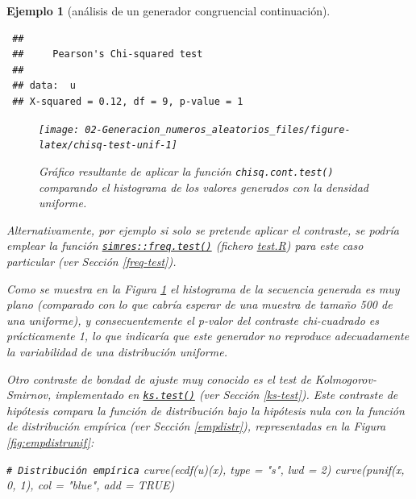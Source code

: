 \documentclass[
  10pt,
]{book}
\newenvironment{Shaded}{\begin{snugshade}}{\end{snugshade}}
\newcommand{\AttributeTok}[1]{\textcolor[rgb]{0.77,0.63,0.00}{#1}}
\newcommand{\CommentTok}[1]{\textcolor[rgb]{0.56,0.35,0.01}{\textit{#1}}}
\newcommand{\ConstantTok}[1]{\textcolor[rgb]{0.00,0.00,0.00}{#1}}
\newcommand{\DecValTok}[1]{\textcolor[rgb]{0.00,0.00,0.81}{#1}}
\newcommand{\FunctionTok}[1]{\textcolor[rgb]{0.00,0.00,0.00}{#1}}
\newcommand{\NormalTok}[1]{#1}
\newcommand{\StringTok}[1]{\textcolor[rgb]{0.31,0.60,0.02}{#1}}
\theoremstyle{break}
\newtheorem{example}{Ejemplo}[chapter]
\theoremstyle{nonumberplain}
\renewcommand{\CommentTok}[1]{\textcolor[rgb]{0.41,0.41,0.41}{\texttt{#1}}}
\begin{document}
\begin{example}[análisis de un generador congruencial continuación]
\begin{verbatim}
 ## 
 ##     Pearson's Chi-squared test
 ## 
 ## data:  u
 ## X-squared = 0.12, df = 9, p-value = 1
\end{verbatim}

\begin{figure}[!htbp]

{\centering \texttt{[image: 02-Generacion\_numeros\_aleatorios\_files/figure-latex/chisq-test-unif-1]} 

}

\caption{Gráfico resultante de aplicar la función \texttt{chisq.cont.test()} comparando el histograma de los valores generados con la densidad uniforme.}\label{fig:chisq-test-unif}
\end{figure}

Alternativamente, por ejemplo si solo se pretende aplicar el contraste, se podría emplear la función \href{https://rubenfcasal.github.io/simres/reference/freq.test.html}{\texttt{simres::freq.test()}} (fichero \href{R/test.R}{\emph{test.R}}) para este caso particular (ver Sección \ref{freq-test}).

Como se muestra en la Figura \ref{fig:chisq-test-unif} el histograma de la secuencia generada es muy plano (comparado con lo que cabría esperar de una muestra de tamaño 500 de una uniforme), y consecuentemente el p-valor del contraste chi-cuadrado es prácticamente 1, lo que indicaría que este generador no reproduce adecuadamente la variabilidad de una distribución uniforme.

Otro contraste de bondad de ajuste muy conocido es el test de Kolmogorov-Smirnov, implementado en \href{https://rdrr.io/r/stats/ks.test.html}{\texttt{ks.test()}} (ver Sección \ref{ks-test}).
Este contraste de hipótesis compara la función de distribución bajo la hipótesis nula con la función de distribución empírica (ver Sección \ref{empdistr}), representadas en la Figura \ref{fig:empdistrunif}:

\begin{Shaded}
\begin{Highlighting}[]
\CommentTok{\# Distribución empírica}
\FunctionTok{curve}\NormalTok{(}\FunctionTok{ecdf}\NormalTok{(u)(x), }\AttributeTok{type =} \StringTok{"s"}\NormalTok{, }\AttributeTok{lwd =} \DecValTok{2}\NormalTok{)}
\FunctionTok{curve}\NormalTok{(}\FunctionTok{punif}\NormalTok{(x, }\DecValTok{0}\NormalTok{, }\DecValTok{1}\NormalTok{), }\AttributeTok{col =} \StringTok{"blue"}\NormalTok{, }\AttributeTok{add =} \ConstantTok{TRUE}\NormalTok{)}
\end{Highlighting}
\end{Shaded}


\end{example}
\end{document}
